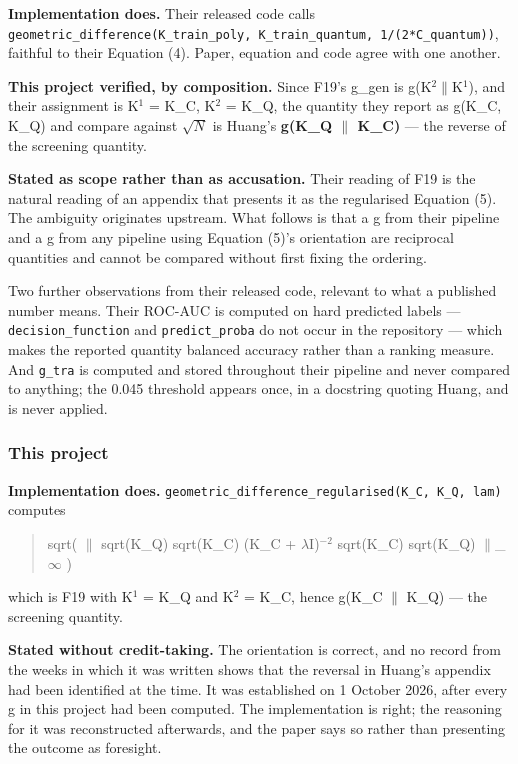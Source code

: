 \documentclass[
  10pt,
]{article}
\begin{document}
\textbf{Implementation does.} Their released code calls
\texttt{geometric\_\allowbreak{}difference(K\_\allowbreak{}train\_\allowbreak{}poly,\ K\_\allowbreak{}train\_\allowbreak{}quantum,\ 1/\allowbreak{}(2*C\_\allowbreak{}quantum))},
faithful to their Equation (4). Paper, equation and code agree with one
another.

\textbf{This project verified, by composition.} Since F19's g\_gen is
g(K\(^{2}\)\(\|\)K\(^{1}\)), and their assignment is K\(^{1}\) = K\_C,
K\(^{2}\) = K\_Q, the quantity they report as g(K\_C, K\_Q) and compare
against \(\sqrt{N}\) is Huang's \textbf{g(K\_Q \(\|\) K\_C)} --- the
reverse of the screening quantity.

\textbf{Stated as scope rather than as accusation.} Their reading of F19
is the natural reading of an appendix that presents it as the
regularised Equation (5). The ambiguity originates upstream. What
follows is that a g from their pipeline and a g from any pipeline using
Equation (5)'s orientation are reciprocal quantities and cannot be
compared without first fixing the ordering.

Two further observations from their released code, relevant to what a
published number means. Their ROC-AUC is computed on hard predicted
labels --- \texttt{decision\_\allowbreak{}function} and \texttt{predict\_\allowbreak{}proba} do
not occur in the repository --- which makes the reported quantity
balanced accuracy rather than a ranking measure. And \texttt{g\_\allowbreak{}tra} is
computed and stored throughout their pipeline and never compared to
anything; the 0.045 threshold appears once, in a docstring quoting
Huang, and is never applied.

\subsubsection{This project}\label{this-project}

\textbf{Implementation does.}
\texttt{geometric\_\allowbreak{}difference\_\allowbreak{}regularised(K\_\allowbreak{}C,\ K\_\allowbreak{}Q,\ lam)} computes

\begin{quote}
sqrt( \(\|\) sqrt(K\_Q) sqrt(K\_C) (K\_C + \(\lambda\)I)\(^{-2}\)
sqrt(K\_C) sqrt(K\_Q) \(\|\)\_\(\infty\) )
\end{quote}

which is F19 with K\(^{1}\) = K\_Q and K\(^{2}\) = K\_C, hence g(K\_C
\(\|\) K\_Q) --- the screening quantity.

\textbf{Stated without credit-taking.} The orientation is correct, and
no record from the weeks in which it was written shows that the reversal
in Huang's appendix had been identified at the time. It was established
on 1 October 2026, after every g in this project had been computed. The
implementation is right; the reasoning for it was reconstructed
afterwards, and the paper says so rather than presenting the outcome as
foresight.
\end{document}

